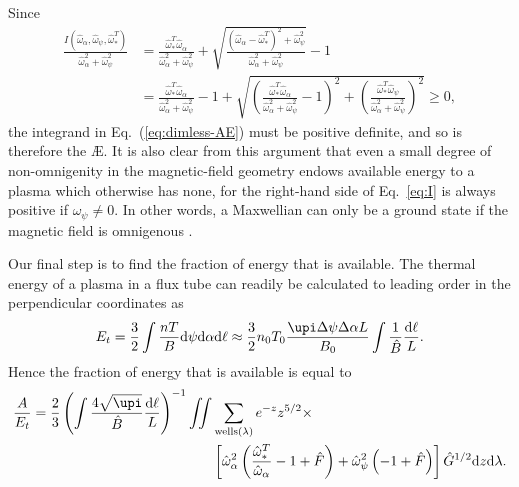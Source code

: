 Since
\begin{equation}
    \begin{aligned}     
    \frac{I(\hat{\omega}_\alpha,\hat{\omega}_\psi,\hat{\omega}_*^T)}{\hat{\omega}_\alpha^2 + \hat{\omega}_\psi^2} &= \frac{\hat{\omega}_*^T \hat{\omega}_\alpha}{\hat{\omega}_\alpha^2 + \hat{\omega}_\psi^2} + \sqrt{\frac{(\hat{\omega}_\alpha-\hat{\omega}_*^T)^2 + \hat{\omega}_\psi^2}{\hat{\omega}_\alpha^2 + \hat{\omega}_\psi^2}} - 1 \\
        &= \frac{\hat{\omega}_*^T \hat{\omega}_\alpha}{\hat{\omega}_\alpha^2 + \hat{\omega}_\psi^2} -1 + \sqrt{\left( \frac{\hat{\omega}_*^T \hat{\omega}_\alpha}{\hat{\omega}_\alpha^2 + \hat{\omega}_\psi^2} - 1 \right)^2 + \left( \frac{\hat{\omega}_*^T \hat{\omega}_\psi}{ \hat{\omega}_\alpha^2 + \hat{\omega}_\psi^2 } \right)^2 } \geq 0,
    \end{aligned}
    \label{eq:I}
\end{equation}
the integrand in Eq.~(\ref{eq:dimless-AE}) must be positive definite, and so is therefore the \AE{}. It is also clear from this argument that even a small degree of non-omnigenity in the magnetic-field geometry endows available energy to a plasma which otherwise has none, for the right-hand side of Eq.~\eqref{eq:I} is always positive if $\hat{\omega}_\psi \ne 0$. In other words, a Maxwellian can only be a ground state if the magnetic field is omnigenous \citep{Helander2020AvailablePlasmas}. \par 
Our final step is to find the fraction of energy that is available. The thermal energy of a plasma in a flux tube can readily be calculated to leading order in the perpendicular coordinates as
\begin{equation}
    E_t = \frac{3}{2} \int \frac{n T}{B} \mathrm{d}\psi \mathrm{d}\alpha \mathrm{d}\ell \approx \frac{3}{2} n_0 T_0 \frac{\upi \Delta \psi \Delta \alpha L}{B_0} \int \frac{1}{\hat{B}} \frac{ \mathrm{d} \ell}{L}.
\end{equation}
Hence the fraction of energy that is available is equal to
\begin{equation}
\begin{aligned}
    \frac{A}{E_t} = \frac{2}{3} \left( \int \frac{4 \sqrt \upi}{\hat{B}} \frac{ \mathrm{d} \ell}{L} \right)^{-1} \iint & \sum_{\text{wells}(\lambda)} e^{-z} z^{5/2} \times \\
    & \left[ \hat{\omega}_\alpha^2 \left( \frac{\hat{\omega}_*^T}{\hat{\omega}_\alpha} - 1 +  \hat{F} \right) + \hat{\omega}_\psi^2 \left( -1 + \hat{F} \right)  \right] \hat{G}^{1/2} \mathrm{d}z \mathrm{d}\lambda.
    \label{eq:AE-per-total-energy}
\end{aligned}
\end{equation}
